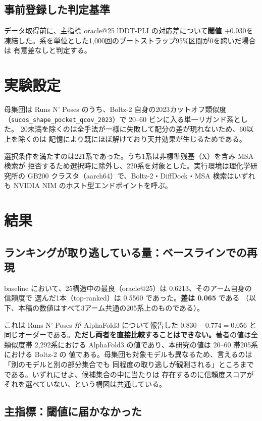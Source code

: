 \documentclass[11pt]{article}
\begin{document}
\subsection{事前登録した判定基準}

データ取得前に、主指標 oracle@25 lDDT-PLI の対応差について\textbf{閾値 $+0.030$}を
凍結した。系を単位とした1,000回のブートストラップ95\%区間が0を跨いだ場合は
有意差なしと判定する。

\section{実験設定}

母集団は Runs N' Poses のうち、Boltz-2 自身の2023カットオフ類似度
（\texttt{sucos\_shape\_pocket\_qcov\_2023}）で 20--60 ビンに入る単一リガンド系とした。
20未満を除くのは全手法が一様に失敗して配分の差が現れないため、60以上を除くのは
記憶により既にほぼ解けており天井効果が生じるためである。

選択条件を満たすのは221系であった。うち1系は非標準残基（X）を含み MSA 検索が
拒否するため選択時に除外し、220系を対象とした。実行環境は理化学研究所の
GB200 クラスタ（aarch64）で、Boltz-2・DiffDock・MSA 検索はいずれも
NVIDIA NIM のホスト型エンドポイントを呼ぶ。

\section{結果}

\subsection{ランキングが取り逃している量：ベースラインでの再現}

baseline において、25構造中の最良（oracle@25）は 0.6213、そのアーム自身の信頼度で
選んだ1本（top-ranked）は 0.5560 であった。\textbf{差は 0.065} である
（以下、本稿の数値はすべて3アーム共通の205系上のものである）。

これは Runs N' Poses が AlphaFold3 について報告した $0.830 - 0.774 = 0.056$ と
同じオーダーである。\textbf{ただし両者を直接比較することはできない。}著者の値は全類似度帯
2,292系における AlphaFold3 の値であり、本研究の値は 20--60 帯205系における Boltz-2 の
値である。母集団も対象モデルも異なるため、言えるのは「別のモデルと別の部分集合でも
同程度の取り逃しが観測される」ところまでである。いずれにせよ、候補集合の中に当たりは
存在するのに信頼度スコアがそれを選べていない、という構図は共通している。

\subsection{主指標：閾値に届かなかった}
\end{document}
